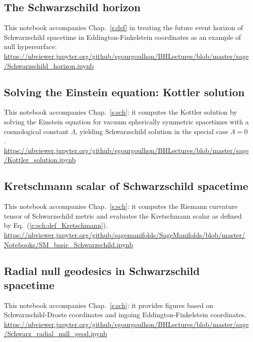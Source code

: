 \subsection{The Schwarzschild horizon} \label{s:sam:Schwarz_hor}

This notebook accompanies Chap.~\ref{s:def} in treating the future event horizon of
Schwarzschild spacetime in Eddington-Finkelstein coordinates as an example of null hypersurface:\\[1ex]
{\footnotesize
\url{https://nbviewer.jupyter.org/github/egourgoulhon/BHLectures/blob/master/sage/Schwarzschild_horizon.ipynb}
}


\subsection{Solving the Einstein equation: Kottler solution} \label{s:sam:Kottler_solution}

This notebook accompanies Chap.~\ref{s:sch}: it computes the Kottler solution by solving the Einstein
equation for vacuum spherically symmetric spacetimes with a cosmological constant $\Lambda$,
yielding Schwarzschild solution in the special case $\Lambda=0$. \\[1ex]
{\footnotesize
\url{https://nbviewer.jupyter.org/github/egourgoulhon/BHLectures/blob/master/sage/Kottler_solution.ipynb}
}

\subsection{Kretschmann scalar of Schwarzschild spacetime} \label{s:sam:Kretschmann_Schwarz}

This notebook accompanies Chap.~\ref{s:sch}: it computes the Riemann curvature
tensor of Schwarzschild metric and evaluates the Kretschmann scalar as defined
by Eq.~(\ref{e:sch:def_Kretschmann}). \\[1ex]
{\footnotesize
\url{https://nbviewer.jupyter.org/github/sagemanifolds/SageManifolds/blob/master/Notebooks/SM_basic_Schwarzschild.ipynb}
}

\subsection{Radial null geodesics in Schwarzschild spacetime}

This notebook accompanies Chap.~\ref{s:sch}: it provides figures based on
Schwarzschild-Droste coordinates and ingoing Eddington-Finkelstein coordinates.\\[1ex]
{\footnotesize
\url{https://nbviewer.jupyter.org/github/egourgoulhon/BHLectures/blob/master/sage/Schwarz_radial_null_geod.ipynb}
}

